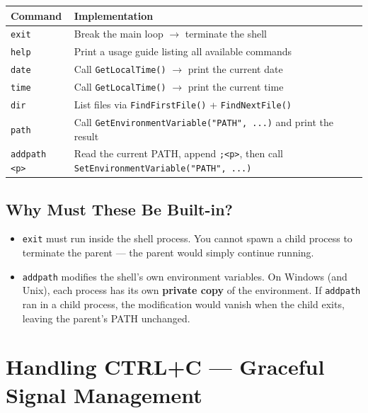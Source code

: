 \documentclass[12pt,a4paper]{article}
\begin{document}
\begin{center}
\renewcommand{\arraystretch}{1.3}
\begin{tabularx}{\textwidth}{l X}
    \toprule
    \textbf{Command} & \textbf{Implementation} \\
    \midrule
    \texttt{exit} & Break the main loop $\rightarrow$ terminate the shell \\
    \texttt{help} & Print a usage guide listing all available commands \\
    \texttt{date} & Call \texttt{GetLocalTime()} $\rightarrow$ print the current date \\
    \texttt{time} & Call \texttt{GetLocalTime()} $\rightarrow$ print the current time \\
    \texttt{dir} & List files via \texttt{FindFirstFile()} + \texttt{FindNextFile()} \\
    \texttt{path} & Call \texttt{GetEnvironmentVariable("PATH", ...)} and print the result \\
    \texttt{addpath <p>} & Read the current PATH, append \texttt{;<p>}, then call \texttt{SetEnvironmentVariable("PATH", ...)} \\
    \bottomrule
\end{tabularx}
\end{center}

\subsection{Why Must These Be Built-in?}

\begin{itemize}
    \item \texttt{exit} must run inside the shell process. You cannot spawn a child process to terminate the parent --- the parent would simply continue running.
    \item \texttt{addpath} modifies the shell's own environment variables. On Windows (and Unix), each process has its own \textbf{private copy} of the environment. If \texttt{addpath} ran in a child process, the modification would vanish when the child exits, leaving the parent's PATH unchanged.
\end{itemize}

\section{Handling CTRL+C --- Graceful Signal Management}
\end{document}
